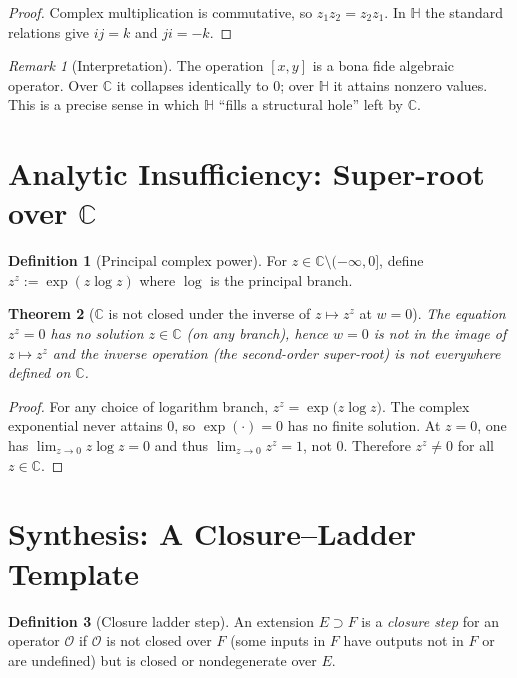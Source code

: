 \documentclass[12pt,a4paper]{article}
\newtheorem{theorem}{Theorem}
\theoremstyle{definition}
\newtheorem{definition}[theorem]{Definition}
\theoremstyle{remark}
\newtheorem*{remark}{Remark}
\begin{document}
\begin{proof}
Complex multiplication is commutative, so $z_1z_2=z_2z_1$. In $\mathbb{H}$ the standard relations give $ij=k$ and $ji=-k$.
\end{proof}

\begin{remark}[Interpretation]
The operation $[x,y]$ is a bona fide algebraic operator. Over $\mathbb{C}$ it collapses identically to $0$; over $\mathbb{H}$ it attains nonzero values. This is a precise sense in which $\mathbb{H}$ ``fills a structural hole'' left by $\mathbb{C}$.
\end{remark}

\section{Analytic Insufficiency: Super-root over $\mathbb{C}$}
\begin{definition}[Principal complex power]
For $z\in\mathbb{C}\setminus(-\infty,0]$, define $z^z:=\exp(z\log z)$ where $\log$ is the principal branch.
\end{definition}

\begin{theorem}[$\mathbb{C}$ is not closed under the inverse of $z\mapsto z^z$ at $w=0$]
\label{thm:superroothole}
The equation $z^z=0$ has no solution $z\in\mathbb{C}$ (on any branch), hence $w=0$ is not in the image of $z\mapsto z^z$ and the inverse operation (the second-order super-root) is not everywhere defined on $\mathbb{C}$.
\end{theorem}

\begin{proof}
For any choice of logarithm branch, $z^z=\exp\!\big(z\log z\big)$. The complex exponential never attains $0$, so $\exp(\cdot)=0$ has no finite solution. At $z=0$, one has $\lim_{z\to 0} z\log z=0$ and thus $\lim_{z\to 0} z^z=1$, not $0$. Therefore $z^z\neq 0$ for all $z\in\mathbb{C}$.
\end{proof}

\section{Synthesis: A Closure--Ladder Template}
\begin{definition}[Closure ladder step]
An extension $E\supset F$ is a \emph{closure step} for an operator $\mathcal{O}$ if $\mathcal{O}$ is not closed over $F$ (some inputs in $F$ have outputs not in $F$ or are undefined) but is closed or nondegenerate over $E$.
\end{definition}
\end{document}
